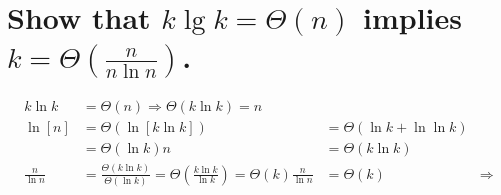 \section[Problem 3]{Show that $k \lg k = \Theta(n)$ implies $k = \Theta\left(\frac{n}{n \ln n}\right)$.}
\begin{align*}
	k \ln k &= \Theta(n) \Longrightarrow \Theta(k \ln k) = n \\
	\ln [n] &= \Theta ( \ln [k \ln k ] )
	&=
	\Theta (\ln k + \ln \ln k) \\
	&= \Theta(\ln k)
	n &= \Theta(k \ln k) \\
	\frac{n}{\ln n} &= \frac{\Theta(k \ln k)}{\Theta(\ln k)} = \Theta \left( \frac{k \ln k}{\ln k} \right) = \Theta(k)
	\frac{n}{\ln n} &= \Theta(k) 
	& \Longrightarrow 
\end{align*}
